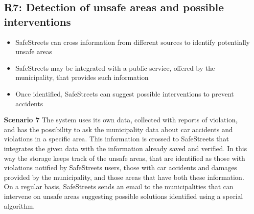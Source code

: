 \subsection{R7: Detection of unsafe areas and possible interventions}
\begin{itemize}
  \item SafeStreets can cross information from different sources to identify potentially unsafe areas
  \item SafeStreets may be integrated with a public service, offered by the municipality, that provides such information
  \item Once identified, SafeStreets can suggest possible interventions to prevent accidents
\end{itemize}
\begin{description}
    \item \textbf{Scenario 7} \newline
        The system uses its own data, collected with reports of violation, and has the possibility to ask the municipality data about car 
        accidents and violations in a specific area. This information is crossed to SafeStreets that integrates the given data with the information
        already saved and verified. In this way the storage keeps track of the unsafe areas, that are identified as those with violations notified
        by SafeStreets users, those with car accidents and damages provided by the municipality, and those areas that have both these 
        information. On a regular basis, SafeStreets sends an email to the municipalities that can intervene on unsafe areas suggesting possible solutions identified using a special algorithm.
        

\end{description}
